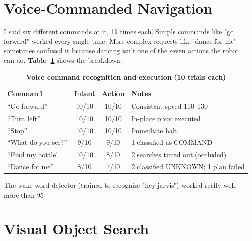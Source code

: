 \section{Voice-Commanded Navigation}
\label{sec:voice_results}

I said six different commands at it, 10 times each. Simple commands like "go forward" worked every single time. More complex requests like "dance for me" sometimes confused it because dancing isn't one of the seven actions the robot can do. \textbf{Table~\ref{tab:voice_results}} shows the breakdown.

\begin{table}[H]
\centering
\caption[Voice command recognition and execution (10 trials each)]{\textbf{Voice command recognition and execution (10 trials each)}}
\label{tab:voice_results}
\begin{tabularx}{\textwidth}{|>{\raggedright\arraybackslash}p{3.2cm}|c|c|X|}
\hline
\textbf{Command} & \textbf{Intent} & \textbf{Action} & \textbf{Notes} \\
\hline
``Go forward'' & 10/10 & 10/10 & Consistent speed 110--130 \\
\hline
``Turn left'' & 10/10 & 10/10 & In-place pivot executed \\
\hline
``Stop'' & 10/10 & 10/10 & Immediate halt \\
\hline
``What do you see?'' & 9/10 & 9/10 & 1 classified as COMMAND \\
\hline
``Find my bottle'' & 10/10 & 8/10 & 2 searches timed out (occluded) \\
\hline
``Dance for me'' & 8/10 & 7/10 & 2 classified UNKNOWN; 1 plan failed \\
\hline
\end{tabularx}
\end{table}

The wake-word detector (trained to recognize "hey jarvis") worked really well: more than 95%

\section{Visual Object Search}
\label{sec:search_results}

